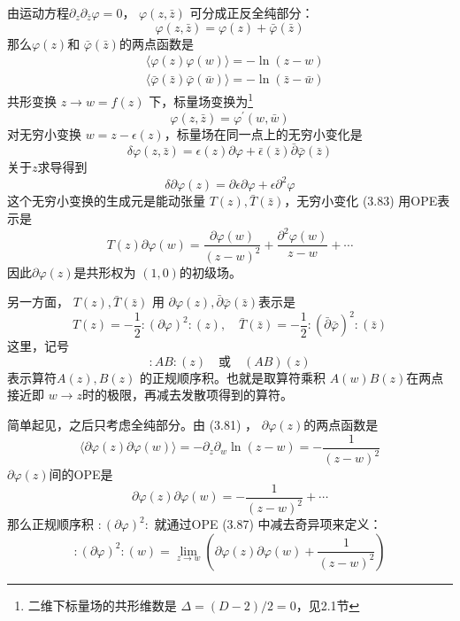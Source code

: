 由运动方程$ \partial_{z} \partial_{\bar{z}} \varphi=0 $， $\varphi(z,\bar{z})$ 可分成正反全纯部分：
\begin{equation}
	\varphi(z, \bar{z})=\varphi(z)+\bar{\varphi}(\bar{z})
\end{equation}
那么$ \varphi(z) $和 $\bar{\varphi}(\bar{z}) $的两点函数是
\begin{align} &\langle\varphi(z) \varphi(w)\rangle=-\ln (z-w) \\ &\langle\bar{\varphi}(\bar{z}) \bar{\varphi}(\bar{w})\rangle=-\ln (\bar{z}-\bar{w}) \end{align}
共形变换 $z\to w=f(z)$ 下，标量场变换为\footnote{二维下标量场的共形维数是 $\Delta=(D-2)/2=0 $，见2.1节}
\[\varphi(z, \bar{z})=\varphi^{\prime}(w, \bar{w})
\]
对无穷小变换 $w=z-\epsilon(z) $，标量场在同一点上的无穷小变化是
$$
\delta \varphi(z, \bar{z})=\epsilon(z) \partial \varphi+\bar{\epsilon}(\bar{z}) \bar{\partial} \bar{\varphi}(\bar{z})
$$
关于$ z $求导得到
\begin{equation}
	\delta \partial \varphi(z)=\partial \epsilon \partial \varphi+\epsilon \partial^{2} \varphi
\end{equation}
这个无穷小变换的生成元是能动张量 $T(z),\bar{T}(\bar{z}) $，无穷小变化 (3.83) 用OPE表示是
\begin{equation}
	T(z) \partial \varphi(w)=\frac{\partial \varphi(w)}{(z-w)^{2}}+\frac{\partial^{2} \varphi(w)}{z-w}+\cdots
\end{equation}
因此$ \partial \varphi(z) $是共形权为 $(1,0) $的初级场。

另一方面， $T(z),\bar{T}(\bar{z})$ 用 $\partial \varphi(z),\bar{\partial}\bar{\varphi}(\bar{z}) $表示是
\begin{equation}
	T(z)=-\frac{1}{2}:(\partial \varphi)^{2}:(z), \quad \bar{T}(\bar{z})=-\frac{1}{2}:(\bar{\partial} \bar{\varphi})^{2}:(\bar{z})
\end{equation}
这里，记号
$$
:AB:(z)\quad\text{或}\quad(AB)(z)
$$
表示算符$ A(z),B(z)$ 的正规顺序积。也就是取算符乘积 $A(w)B(z) $在两点接近即 $w\to z $时的极限，再减去发散项得到的算符。

简单起见，之后只考虑全纯部分。由 (3.81) ， $\partial \varphi(z) $的两点函数是
\begin{equation}
	\langle\partial \varphi(z) \partial \varphi(w)\rangle=-\partial_{z} \partial_{w} \ln (z-w)=-\frac{1}{(z-w)^{2}}
\end{equation}
$\partial \varphi(z) $间的OPE是
\begin{equation}
	\partial \varphi(z) \partial \varphi(w)=-\frac{1}{(z-w)^{2}}+\cdots
\end{equation}
那么正规顺序积 $:(\partial \varphi)^2:$ 就通过OPE (3.87) 中减去奇异项来定义：
\begin{equation}
:(\partial \varphi)^{2}:(w)=\lim _{z \rightarrow w}\left(\partial \varphi(z) \partial \varphi(w)+\frac{1}{(z-w)^{2}}\right)
\end{equation}


